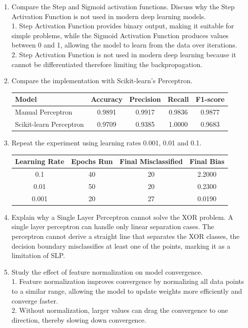 \documentclass[11pt]{article}
\begin{document}
\begin{enumerate}[leftmargin=*]
\item Compare the Step and Sigmoid activation functions. Discuss why the Step Activation Function is not used in modern deep learning models.\\
 1. Step Activation Function provides binary output, making it suitable for simple problems, while the Sigmoid Activation Function produces values between 0 and 1, allowing the model to learn from the data over iterations.\\
 2. Step Activation Function is not used in modern deep learning because it cannot be differentiated therefore limiting the backpropagation. 

\item Compare the implementation with Scikit-learn's Perceptron.
\begin{center}
\begin{tabular}{|l|c|c|c|c|}
\hline
\textbf{Model} & \textbf{Accuracy} & \textbf{Precision} & \textbf{Recall} & \textbf{F1-score}\\
\hline
Manual Perceptron & 0.9891 & 0.9917 & 0.9836 & 0.9877\\
\hline
Scikit-learn Perceptron & 0.9709 & 0.9385 & 1.0000 & 0.9683\\
\hline
\end{tabular}
\end{center}


\item Repeat the experiment using learning rates 0.001, 0.01 and 0.1.
\begin{center}
\begin{tabular}{|c|c|c|c|}
\hline
\textbf{Learning Rate} & \textbf{Epochs Run} & \textbf{Final Misclassified} & \textbf{Final Bias}\\
\hline
0.1   & 40 & 20 & 2.2000\\
0.01  & 50 & 20 & 0.2300\\
0.001 & 20 & 27 & 0.0190\\
\hline
\end{tabular}
\end{center}

\item Explain why a Single Layer Perceptron cannot solve the XOR problem.
 A single layer perceptron can handle only linear separation cases. The perceptron cannot derive a straight line that separates the XOR classes, the decision boundary misclassifies at least one of the points, marking it as a limitation of SLP.

\item Study the effect of feature normalization on model convergence.\\
    1. Feature normalization improves convergence by normalizing all data points to a similar range, allowing the model to update weights more efficiently and converge faster.\\
    2. Without normalization, larger values can drag the convergence to one direction, thereby slowing down convergence.
\end{enumerate}
\end{document}
